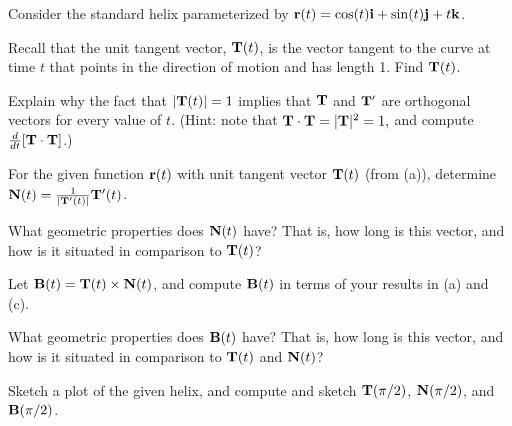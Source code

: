 \begin{exercises}
\item \label{Ez:9.8.4}    Consider the standard helix parameterized by $\mathbf{r}(t) = \cos(t) \mathbf{i} + \sin(t) \mathbf{j} + t \mathbf{k}$.
    \ba
	    \item Recall that the unit tangent vector, $\mathbf{T}(t)$, is the vector tangent to the curve at time $t$ that points in the direction of motion and has length 1.  Find $\mathbf{T}(t)$.
	    \item Explain why the fact that $| \mathbf{T}(t) | = 1$ implies that $\mathbf{T}$ and $\mathbf{T}'$ are orthogonal vectors for every value of $t$.  (Hint:  note that $\mathbf{T} \cdot \mathbf{T} = |\mathbf{T}|^2 = 1,$ and compute $\frac{d}{dt}[\mathbf{T} \cdot \mathbf{T}]$.)
	    \item For the given function $\mathbf{r}(t)$ with unit tangent vector $\mathbf{T}(t)$ (from (a)), determine $\mathbf{N}(t) = \frac{1}{|\mathbf{T}'(t)|} \mathbf{T}'(t)$.
	    \item What geometric properties does $\mathbf{N}(t)$ have?  That is, how long is this vector, and how is it situated in comparison to $\mathbf{T}(t)$?
	    \item Let $\mathbf{B}(t) = \mathbf{T}(t) \times \mathbf{N}(t)$, and compute $\mathbf{B}(t)$ in terms of your results in (a) and (c).
	    \item What geometric properties does $\mathbf{B}(t)$ have?  That is, how long is this vector, and how is it situated in comparison to $\mathbf{T}(t)$ and $\mathbf{N}(t)$?
	    \item Sketch a plot of the given helix, and compute and sketch $\mathbf{T}(\pi/2)$, $\mathbf{N}(\pi/2)$, and $\mathbf{B}(\pi/2)$.    
    \ea



\end{exercises}
